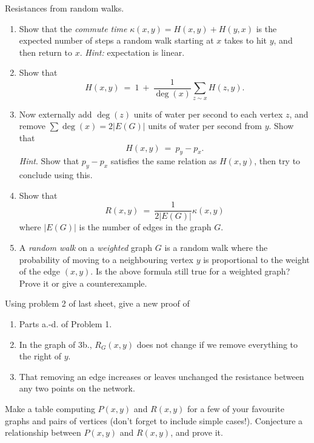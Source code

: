 \documentclass[11pt,fleqn]{book} %
\begin{document}
\begin{problem}
  Resistances from random walks.
  \begin{enumerate}[label =\alph*.]
   \item  Show that the \textit{commute time} $\kappa(x,y)=H(x,y)+H(y,x)$ is the expected number of steps a random walk starting at $x$ takes to hit $y$, and then return to $x$. \textit{Hint:} expectation is linear. 
   \item  Show that 
       $$H(x,y) \ = \ 1 \ + \ \frac{1}{\deg(x)}\sum_{z\sim x} H(z,y).$$
       \item  Now externally add $\deg(z)$ units of water per second to each vertex $z$, and remove $\sum \deg(x) = 2|E(G)|$ units of water per second from $y$. Show that 
       $$H(x,y) \ = \  p_y-p_x.$$
    \textit{Hint}. Show that $p_y-p_x$ satisfies the same relation as $H(x,y)$, then try to conclude using this.
   \item Show that 
    $$R(x,y) \ = \ \frac{1}{2|E(G)|} \kappa(x,y) $$
    where $|E(G)|$ is the number of edges in the graph $G$.
    
    
    \item   A \textit{random walk} on a \textit{weighted} graph $G$ is a random walk where the probability of moving to a neighbouring vertex $y$ is proportional to the weight of the edge $(x,y)$. Is the above formula still true for a weighted graph? Prove it or give a counterexample.
  \end{enumerate}
\end{problem}



\begin{problem}
  Using problem 2 of last sheet, give a new proof of 
  \begin{enumerate}[label =\alph*.]
   \item Parts a.-d. of Problem 1.
   \item In the graph of 3b., $R_{G}(x,y)$ does not change if we remove everything to the right of $y$.  
   \item That removing an edge increases or leaves unchanged the resistance between any two points on the network.
  \end{enumerate}
\end{problem}



\begin{problem}
Make a table computing $P(x,y)$ and $R(x,y)$ for a few of your favourite graphs and pairs of vertices (don't forget to include simple cases!). Conjecture a relationship between $P(x,y)$ and $R(x,y)$, and prove it.
\end{problem}
\end{document}
